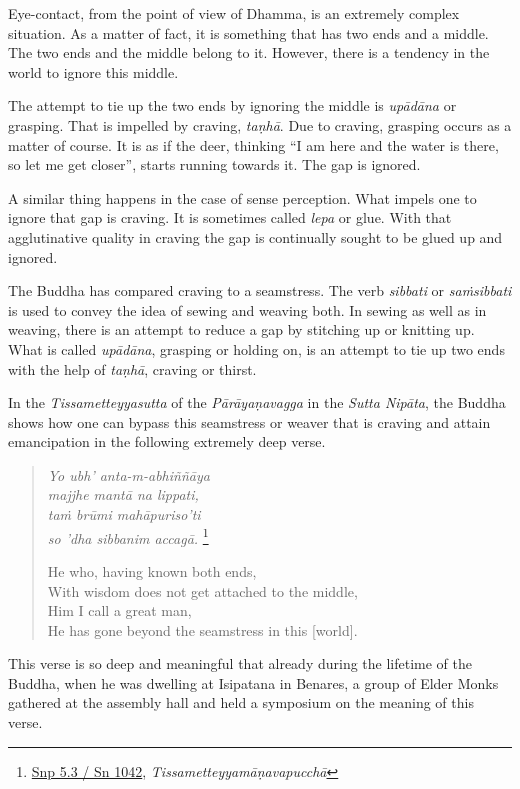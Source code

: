 \enlargethispage{\baselineskip}

Eye-contact, from the point of view of Dhamma, is an extremely complex situation. As a matter of fact, it is something that has two ends and a middle. The two ends and the middle belong to it. However, there is a tendency in the world to ignore this middle.

The attempt to tie up the two ends by ignoring the middle is \emph{upādāna} or grasping. That is impelled by craving, \emph{taṇhā}. Due to craving, grasping occurs as a matter of course. It is as if the deer, thinking ``I am here and the water is there, so let me get closer'', starts running towards it. The gap is ignored.

A similar thing happens in the case of sense perception. What impels one to ignore that gap is craving. It is sometimes called \emph{lepa} or glue. With that agglutinative quality in craving the gap is continually sought to be glued up and ignored.

The Buddha has compared craving to a seamstress. The verb \emph{sibbati} or \emph{saṁsibbati} is used to convey the idea of sewing and weaving both. In sewing as well as in weaving, there is an attempt to reduce a gap by stitching up or knitting up. What is called \emph{upādāna}, grasping or holding on, is an attempt to tie up two ends with the help of \emph{taṇhā}, craving or thirst.

In the \emph{Tissametteyyasutta} of the \emph{Pārāyaṇavagga} in the \emph{Sutta Nipāta}, the Buddha shows how one can bypass this seamstress or weaver that is craving and attain emancipation in the following extremely deep verse.

\begin{quote}
\emph{Yo ubh' anta-m-abhiññāya}\\
\emph{majjhe mantā na lippati,}\\
\emph{taṁ brūmi mahāpuriso'ti}\\
\emph{so 'dha sibbanim accagā.} \footnote{\href{https://suttacentral.net/snp5.3/pli/ms}{Snp 5.3 / Sn 1042}, \emph{Tissametteyyamāṇavapucchā}}

He who, having known both ends,\\
With wisdom does not get attached to the middle,\\
Him I call a great man,\\
He has gone beyond the seamstress in this {[}world{]}.
\end{quote}

This verse is so deep and meaningful that already during the lifetime of the Buddha, when he was dwelling at Isipatana in Benares, a group of Elder Monks gathered at the assembly hall and held a symposium on the meaning of this verse.

